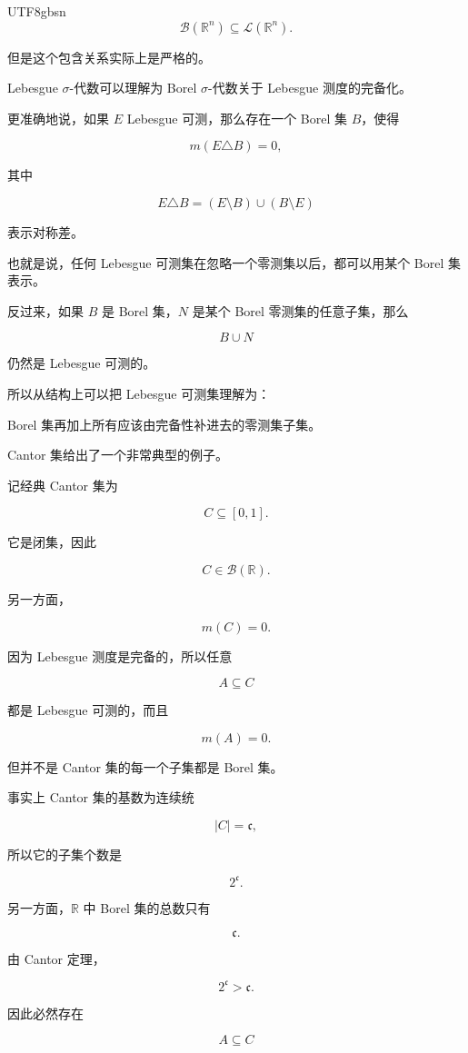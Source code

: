 \documentclass[11pt]{article}
\begin{document}
\begin{CJK*}{UTF8}{gbsn}
\[
\mathcal{B}(\mathbb{R}^{n})\subseteq\mathcal{L}(\mathbb{R}^{n}).
\]

但是这个包含关系实际上是严格的。

Lebesgue $\sigma$-代数可以理解为 Borel $\sigma$-代数关于 Lebesgue 测度的完备化。

更准确地说，如果 $E$ Lebesgue 可测，那么存在一个 Borel 集 $B$，使得

\[
m(E\triangle B)=0,
\]

其中

\[
E\triangle B=(E\setminus B)\cup(B\setminus E)
\]

表示对称差。

也就是说，任何 Lebesgue 可测集在忽略一个零测集以后，都可以用某个 Borel 集表示。

反过来，如果 $B$ 是 Borel 集，$N$ 是某个 Borel 零测集的任意子集，那么

\[
B\cup N
\]

仍然是 Lebesgue 可测的。

所以从结构上可以把 Lebesgue 可测集理解为：

Borel 集再加上所有应该由完备性补进去的零测集子集。

Cantor 集给出了一个非常典型的例子。

记经典 Cantor 集为

\[
C\subseteq[0,1].
\]

它是闭集，因此

\[
C\in\mathcal{B}(\mathbb{R}).
\]

另一方面，

\[
m(C)=0.
\]

因为 Lebesgue 测度是完备的，所以任意

\[
A\subseteq C
\]

都是 Lebesgue 可测的，而且

\[
m(A)=0.
\]

但并不是 Cantor 集的每一个子集都是 Borel 集。

事实上 Cantor 集的基数为连续统

\[
|C|=\mathfrak{c},
\]

所以它的子集个数是

\[
2^{\mathfrak{c}}.
\]

另一方面，$\mathbb{R}$ 中 Borel 集的总数只有

\[
\mathfrak{c}.
\]

由 Cantor 定理，

\[
2^{\mathfrak{c}}>\mathfrak{c}.
\]

因此必然存在

\[
A\subseteq C
\]


\end{CJK*}
\end{document}

